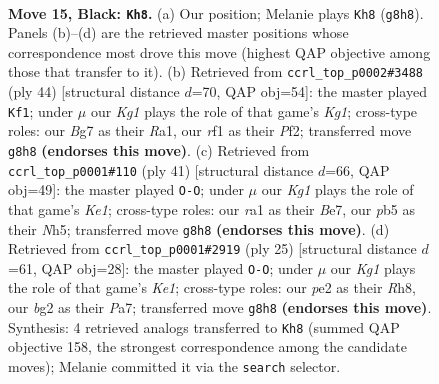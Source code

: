 \documentclass[11pt]{article}
\begin{document}
\clearpage

\begin{figure}[p]\centering
\begin{subfigure}{0.46\textwidth}\centering
\resizebox{\linewidth}{!}{%
\newchessgame
\chessboard[
  setfen={r1br2k1/1pp3bp/5np1/1P3p2/P3pP1P/6P1/4P1B1/RNB2RK1 b - - 0 15},
  showmover=false,
  pgfstyle=straightmove, color=movearrow, markmove={g8-h8}
]}
\caption{}
\end{subfigure}\hfill
\begin{subfigure}{0.46\textwidth}\centering
\resizebox{\linewidth}{!}{%
\newchessgame
\chessboard[
  setfen={r6r/3npk1p/p1p2b2/6p1/NpP1R3/4B1P1/PP3P1P/R5K1 w - - 0 23},
  showmover=false,
  pgfstyle=straightmove, color=movearrow, markmove={g1-f1}
]}
\caption{}
\end{subfigure}
\\[4pt]
\begin{subfigure}{0.46\textwidth}\centering
\resizebox{\linewidth}{!}{%
\newchessgame
\chessboard[
  setfen={r3k2r/1b2bpp1/p3p3/1p5n/3B3p/2P4P/PPB2PP1/R3RNK1 b kq - 2 21},
  showmover=false,
  pgfstyle=straightmove, color=movearrow, markmove={e8-g8}
]}
\caption{}
\end{subfigure}\hfill
\begin{subfigure}{0.46\textwidth}\centering
\resizebox{\linewidth}{!}{%
\newchessgame
\chessboard[
  setfen={3rk2r/pb1n1pp1/1pp1p3/2b4p/4P2P/1P3P2/PBP1B1P1/R2NK2R b KQk - 0 13},
  showmover=false,
  pgfstyle=straightmove, color=movearrow, markmove={e8-g8}
]}
\caption{}
\end{subfigure}
\caption{\textbf{Move 15, Black: \texttt{Kh8}.} (a) Our position; Melanie plays \texttt{Kh8} (\texttt{g8h8}). Panels (b)--(d) are the retrieved master positions whose correspondence most drove this move (highest QAP objective among those that transfer to it). (b) Retrieved from \texttt{ccrl\_top\_p0002\#3488} (ply 44) [structural distance $d$=70, QAP obj=54]: the master played \texttt{Kf1}; under $\mu$ our \emph{Kg1} plays the role of that game's \emph{Kg1}; cross-type roles: our \emph{B}g7 as their \emph{R}a1, our \emph{r}f1 as their \emph{P}f2; transferred move \texttt{g8h8} \textbf{(endorses this move)}. (c) Retrieved from \texttt{ccrl\_top\_p0001\#110} (ply 41) [structural distance $d$=66, QAP obj=49]: the master played \texttt{O-O}; under $\mu$ our \emph{Kg1} plays the role of that game's \emph{Ke1}; cross-type roles: our \emph{r}a1 as their \emph{B}e7, our \emph{p}b5 as their \emph{N}h5; transferred move \texttt{g8h8} \textbf{(endorses this move)}. (d) Retrieved from \texttt{ccrl\_top\_p0001\#2919} (ply 25) [structural distance $d$=61, QAP obj=28]: the master played \texttt{O-O}; under $\mu$ our \emph{Kg1} plays the role of that game's \emph{Ke1}; cross-type roles: our \emph{p}e2 as their \emph{R}h8, our \emph{b}g2 as their \emph{P}a7; transferred move \texttt{g8h8} \textbf{(endorses this move)}. Synthesis: 4 retrieved analogs transferred to \texttt{Kh8} (summed QAP objective 158, the strongest correspondence among the candidate moves); Melanie committed it via the \texttt{search} selector.}
\label{fig:thought-m29}
\end{figure}
\end{document}
